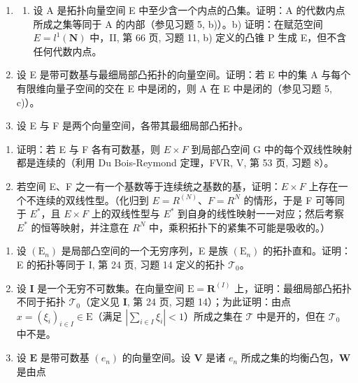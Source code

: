 \begin{enumerate}
\def\labelenumi{\arabic{enumi})}
\setcounter{enumi}{6}
\item
  \begin{enumerate}
  \def\labelenumii{\alph{enumii})}
  \tightlist
  \item
    设 A 是拓扑向量空间 E 中至少含一个内点的凸集。证明：A 的代数内点所成之集等同于 A 的内部（参见习题 5, b)）。b) 证明：在赋范空间 \(E = l^{1}(\mathbf{N})\) 中，II, 第 66 页, 习题 11, b) 定义的凸锥 P 生成 E，但不含任何代数内点。
  \end{enumerate}
\item
  设 E 是带可数基与最细局部凸拓扑的向量空间。证明：若 E 中的集 A 与每个有限维向量子空间的交在 E 中是闭的，则 A 在 E 中是闭的（参见习题 5, c)）。
\item
  设 E 与 F 是两个向量空间，各带其最细局部凸拓扑。
\end{enumerate}

\begin{enumerate}
\def\labelenumi{\alph{enumi})}
\item
  证明：若 E 与 F 各有可数基，则 \(E \times F\) 到局部凸空间 G 中的每个双线性映射都是连续的（利用 Du Bois-Reymond 定理，FVR, V, 第 53 页, 习题 8）。
\item
  若空间 E、F 之一有一个基数等于连续统之基数的基，证明：\(E \times F\) 上存在一个不连续的双线性型。（化归到 \(E = R^{(N)}\)、\(F = R^{N}\) 的情形，于是 F 可等同于 \(E^{*}\)，且 \(E \times F\) 上的双线性型与 \(E^{*}\) 到自身的线性映射一一对应；然后考察 \(E^{*}\) 的恒等映射，并注意在 \(R^{N}\) 中，乘积拓扑下的紧集不可能是吸收的。）
\end{enumerate}

\begin{enumerate}
\def\labelenumi{\arabic{enumi})}
\setcounter{enumi}{9}
\item
  设 \((\mathrm{E}_n)\) 是局部凸空间的一个无穷序列，E 是族 \((\mathrm{E}_n)\) 的拓扑直和。证明：E 的拓扑等同于 I, 第 24 页, 习题 14 定义的拓扑 \(\mathcal{T}_0\)。
\item
  设 \(\mathbf{I}\) 是一个无穷不可数集。在向量空间 \(\mathrm{E} = \mathbf{R}^{(I)}\) 上，证明：最细局部凸拓扑不同于拓扑 \(\mathcal{T}_0\)（定义见 \(\mathbf{I}\), 第 24 页, 习题 14）；为此证明：由点 \(x = (\xi_{i})_{i\in I} \in \mathrm{E}\)（满足 \(|\sum_{i\in I} \xi_i| < 1\)）所成之集在 \(\mathcal{T}\) 中是开的，但在 \(\mathcal{T}_0\) 中不是。
\item
  设 \(\mathbf{E}\) 是带可数基 \((e_n)\) 的向量空间。设 \(\mathbf{V}\) 是诸 \(e_n\) 所成之集的均衡凸包，\(\mathbf{W}\) 是由点
\end{enumerate}

